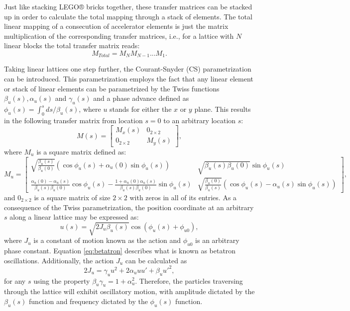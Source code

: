 Just like stacking LEGO® bricks together, these transfer matrices can be stacked up in order to calculate the total mapping through a stack of elements. The total linear mapping of a consecution of accelerator elements is just the matrix multiplication of the corresponding transfer matrices, i.e., for a lattice with $N$ linear blocks the total transfer matrix reads:
\begin{equation}
    \label{eq:consecution}
    M_{Total}=M_NM_{N-1}...M_1.     
\end{equation}

Taking linear lattices one step further, the Courant-Snyder (CS) parametrization can be introduced. This parametrization employs the fact that any linear element or stack of linear elements can be parametrized by the Twiss functions $\beta_u(s),\alpha_u(s)$ and $\gamma_u(s)$ and a phase advance defined as $  \phi_u(s)=\int_0^s ds/\beta_u(s)$, where $u$ stands for either the $x$ or $y$ plane. This results in the following transfer matrix from location $s=0$ to an arbitrary location $s$:
\begin{equation}
    \label{eq:twissmatrix}
    M(s)= 
    \begin{bmatrix} 
    M_x(s) & 0_{2 \times 2} \\ 
    0_{2 \times 2} & M_y(s)
    \end{bmatrix},
\end{equation}
where $M_u$ is a square matrix defined as:
\begin{equation}
    \label{eq:mu}
    M_u= 
    \begin{bmatrix} 
    \sqrt{\frac{\beta_u(s)}{\beta_u (0)}}\left( \cos  \phi_u(s) +\alpha_u(0) \sin  \phi_u(s) \right) & \sqrt{\beta_u(s) \beta_u(0)} \sin  \phi_u(s) \\ \frac{\alpha_u(0)-\alpha_u(s)}{\beta_u(s) \beta_u(0)}\cos  \phi_u(s) - \frac{1+\alpha_u(0)\alpha_u(s)}{\beta_u(s) \beta_u(0)} \sin  \phi_u(s) & \sqrt{\frac{\beta_u(0)}{\beta_u (s)}}\left( \cos  \phi_u(s) - \alpha_u(s) \sin  \phi_u(s) \right) 
    \end{bmatrix},
\end{equation}
and $0_{2\times 2}$ is a square matrix of size $2\times 2$ with zeros in all of its entries. As a consequence of the Twiss parametrization, the position coordinate at an arbitrary $s$ along a linear lattice may be expressed as:
\begin{equation}
    \label{eq:betatron}
    u(s)=\sqrt{2 J_u \beta_u(s)} \cos \left(  \phi_u(s) + \phi_{u0} \right),
\end{equation} 
where $J_u$ is a constant of motion known as the action and $\phi_{u0}$ is an arbitrary phase constant. Equation \ref{eq:betatron} describes what is known as betatron oscillations. Additionally, the action $J_u$ can be calculated as 
\begin{equation}
    \label{eq:ellipse}
    2J_u=\gamma_u u^2 +2\alpha_u u u' +\beta_u u'^2, 
\end{equation}
for any $s$ using the property $\beta_u \gamma_u = 1+\alpha_u^2$. Therefore, the particles traversing through the lattice will exhibit oscillatory motion, with amplitude dictated by the $\beta_u(s)$ function and frequency dictated by the $ \phi_u(s)$ function.

